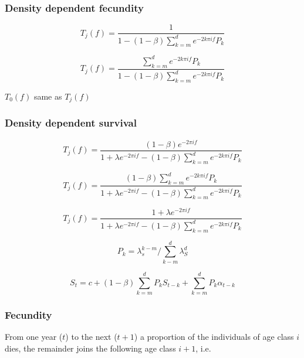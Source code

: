 \documentclass[%
nonumbib,      %
%
]{nrc1}                          %
\begin{document}
\subsubsection{Density dependent fecundity}

\begin{equation}
T_j(f)=\frac{1}{1-(1-\beta)\sum\limits_{k=m}^d e^{-2k\pi if} P_k}
\end{equation}

\begin{equation}
T_j(f)=\frac{\sum\limits_{k=m}^d e^{-2k \pi if} P_k}{1-(1-\beta)\sum\limits_{k=m}^d e^{-2k \pi if} P_k}
\end{equation}

$T_0(f)$ same as $T_j(f)$

\subsubsection{Density dependent survival}

\begin{equation}
T_j(f)=\frac{(1 - \beta) e^{-2\pi if}}{1+\lambda e^{-2\pi if}-(1-\beta)\sum\limits_{k=m}^d e^{-2k\pi if} P_k}
\end{equation}

\begin{equation}
T_j(f)=\frac{(1-\beta)\sum\limits_{k=m}^d e^{-2k\pi if} P_k}{1+\lambda e^{-2\pi if}-(1-\beta)\sum\limits_{k=m}^d e^{-2k\pi if} P_k}
\end{equation}

\begin{equation}
T_j(f)=\frac{1+\lambda e^{-2 \pi i f}}{1+\lambda e^{-2\pi if}-(1-\beta)\sum\limits_{k=m}^d e^{-2k\pi if} P_k}
\end{equation}

\begin{equation}
P_k=\lambda_s^{k-m}/\sum\limits_{k-m}^d \lambda^d_{S}
\end{equation}

\begin{equation}
S_t = c + (1-\beta) \sum_{k=m}^d P_k S_{t-k} + \sum_{k=m}^d P_k \alpha_{t-k}
\end{equation}

\subsubsection{Fecundity}

From one year ($t$) to the next ($t+1$) a proportion of the individuals of age class $i$ dies, the remainder joins the following age class $i+1$, i.e.
\end{document}

